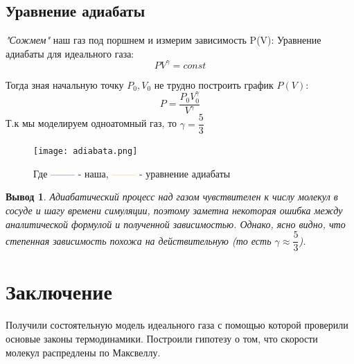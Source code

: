 \documentclass[twoside,twocolumn, 11pt]{article}
\theoremstyle{plain}
\newtheorem{conclusion}{Вывод}
\theoremstyle{definition}
\begin{document}

\subsection{Уравнение адиабаты}
\textit{"Сожмем"} наш газ под поршнем и измерим зависимость P(V):
Уравнение адиабаты для идеального газа:
\[PV^\gamma = const \]

Тогда зная начальную точку $P_0, V_0$ не трудно построить график $P(V)$:
\[P = \dfrac{P_0 V_0^\gamma}{V ^\gamma} \]
Т.к мы моделируем одноатомный газ, то $\gamma = \dfrac{5}{3}$

\begin{figure}[!h]
{\texttt{[image: adiabata.png]}}
\caption{}
Где \textcolor{blue}{--------} - наша, \textcolor{orange}{--------} - уравнение адиабаты
\end{figure}


\begin{conclusion}
Адиабатический процесс над газом чувствителен к числу молекул в сосуде и шагу времени симуляции, поэтому заметна некоторая
ошибка между аналитической формулой и полученной зависимостью. Однако, ясно видно, что степенная зависимость
похожа на действительную (то есть $\gamma \approx \dfrac{5}{3}$).
\end{conclusion}

\section{Заключение}
\indent Получили состоятельную модель идеального газа с помощью которой проверили основые законы термодинамики. Построили гипотезу о том,
что скорости молекул распредлены по Максвеллу.
\end{document}
